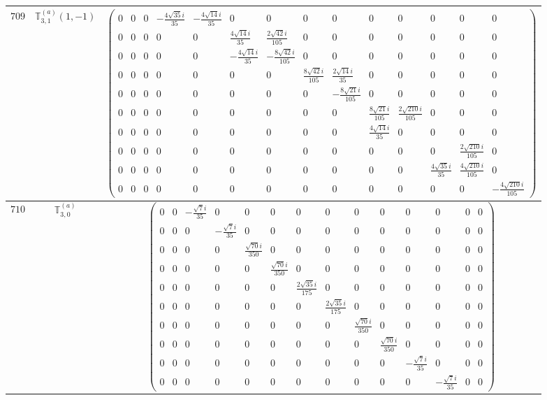 \documentclass[fleqn,8pt,landscape]{jsarticle}
\begin{document}
\begin{center}
\begin{longtable}{ccc}
$ 709 $ & $ \mathbb{T}_{3,1}^{(a)}(1,-1) $ & $ \begin{pmatrix} 0 & 0 & 0 & - \frac{4 \sqrt{35} i}{35} & - \frac{4 \sqrt{14} i}{35} & 0 & 0 & 0 & 0 & 0 & 0 & 0 & 0 & 0 \\ 0 & 0 & 0 & 0 & 0 & \frac{4 \sqrt{14} i}{35} & \frac{2 \sqrt{42} i}{105} & 0 & 0 & 0 & 0 & 0 & 0 & 0 \\ 0 & 0 & 0 & 0 & 0 & - \frac{4 \sqrt{14} i}{35} & - \frac{8 \sqrt{42} i}{105} & 0 & 0 & 0 & 0 & 0 & 0 & 0 \\ 0 & 0 & 0 & 0 & 0 & 0 & 0 & \frac{8 \sqrt{42} i}{105} & \frac{2 \sqrt{14} i}{35} & 0 & 0 & 0 & 0 & 0 \\ 0 & 0 & 0 & 0 & 0 & 0 & 0 & 0 & - \frac{8 \sqrt{21} i}{105} & 0 & 0 & 0 & 0 & 0 \\ 0 & 0 & 0 & 0 & 0 & 0 & 0 & 0 & 0 & \frac{8 \sqrt{21} i}{105} & \frac{2 \sqrt{210} i}{105} & 0 & 0 & 0 \\ 0 & 0 & 0 & 0 & 0 & 0 & 0 & 0 & 0 & \frac{4 \sqrt{14} i}{35} & 0 & 0 & 0 & 0 \\ 0 & 0 & 0 & 0 & 0 & 0 & 0 & 0 & 0 & 0 & 0 & 0 & \frac{2 \sqrt{210} i}{105} & 0 \\ 0 & 0 & 0 & 0 & 0 & 0 & 0 & 0 & 0 & 0 & 0 & \frac{4 \sqrt{35} i}{35} & \frac{4 \sqrt{210} i}{105} & 0 \\ 0 & 0 & 0 & 0 & 0 & 0 & 0 & 0 & 0 & 0 & 0 & 0 & 0 & - \frac{4 \sqrt{210} i}{105} \end{pmatrix} $ \\ \hline
$ 710 $ & $ \mathbb{T}_{3,0}^{(a)} $ & $ \begin{pmatrix} 0 & 0 & - \frac{\sqrt{7} i}{35} & 0 & 0 & 0 & 0 & 0 & 0 & 0 & 0 & 0 & 0 & 0 \\ 0 & 0 & 0 & - \frac{\sqrt{7} i}{35} & 0 & 0 & 0 & 0 & 0 & 0 & 0 & 0 & 0 & 0 \\ 0 & 0 & 0 & 0 & \frac{\sqrt{70} i}{350} & 0 & 0 & 0 & 0 & 0 & 0 & 0 & 0 & 0 \\ 0 & 0 & 0 & 0 & 0 & \frac{\sqrt{70} i}{350} & 0 & 0 & 0 & 0 & 0 & 0 & 0 & 0 \\ 0 & 0 & 0 & 0 & 0 & 0 & \frac{2 \sqrt{35} i}{175} & 0 & 0 & 0 & 0 & 0 & 0 & 0 \\ 0 & 0 & 0 & 0 & 0 & 0 & 0 & \frac{2 \sqrt{35} i}{175} & 0 & 0 & 0 & 0 & 0 & 0 \\ 0 & 0 & 0 & 0 & 0 & 0 & 0 & 0 & \frac{\sqrt{70} i}{350} & 0 & 0 & 0 & 0 & 0 \\ 0 & 0 & 0 & 0 & 0 & 0 & 0 & 0 & 0 & \frac{\sqrt{70} i}{350} & 0 & 0 & 0 & 0 \\ 0 & 0 & 0 & 0 & 0 & 0 & 0 & 0 & 0 & 0 & - \frac{\sqrt{7} i}{35} & 0 & 0 & 0 \\ 0 & 0 & 0 & 0 & 0 & 0 & 0 & 0 & 0 & 0 & 0 & - \frac{\sqrt{7} i}{35} & 0 & 0 \end{pmatrix} $ \\ \hline

\end{longtable}
\end{center}
\end{document}
